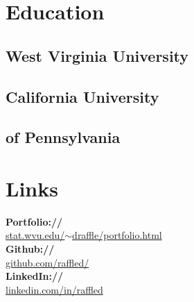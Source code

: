 \documentclass[letterpaper]{deedy-resume} %
\begin{document}




\begin{minipage}[t]{0.35\textwidth} %


\section{Education} 
\subsection{West Virginia University}
\sectionspace %


\subsection{California University}
\subsection{of Pennsylvania}

\sectionspace %


\section{Links} 
{\bf Portfolio://}\\ \href{http://stat.wvu.edu/~draffle/portfolio.html}{stat.wvu.edu/$\sim$draffle/portfolio.html}\\
{\bf Github://}\\ \href{http://github.com/raffled/}{github.com/raffled/}\\
{\bf LinkedIn://}\\ \href{https://www.linkedin.com/in/raffled}{linkedin.com/in/raffled} \\
\sectionspace %


\end{minipage}
\end{document}
